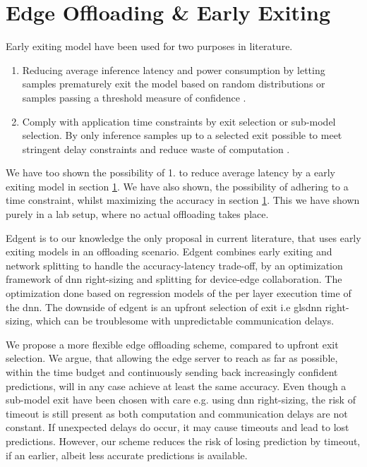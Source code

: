 \chapter{Edge Offloading \& Early Exiting}

Early exiting model have been used for two purposes in literature.

\begin{enumerate}
	\item Reducing average inference latency and power consumption by letting samples prematurely exit the model based on random distributions \cite{bibid} or samples passing a threshold measure of confidence \cite{teerapittayanon_branchynet:_2016}.
	\item Comply with application time constraints by exit selection or sub-model selection. By only inference samples up to a selected exit possible to meet stringent delay constraints and reduce waste of computation \cite{li_edge_2018}. 
\end{enumerate}

We have too shown the possibility of 1. to reduce average latency by a early exiting model in section \ref{}. We have also shown, the possibility of adhering to a time constraint, whilst maximizing the accuracy in section \ref{}. This we have shown purely in a lab setup, where no actual offloading takes place. 

Edgent \cite{li_edge_2018} is to our knowledge the only proposal in current literature, that uses early exiting models in an offloading scenario. Edgent combines early exiting and network splitting to handle the accuracy-latency trade-off, by an optimization framework of \gls{dnn} right-sizing and splitting for device-edge collaboration. The optimization done based on regression models of the per layer execution time of the \gls{dnn}. The downside of edgent is an upfront selection of exit i.e gls{dnn} right-sizing, which can be troublesome with unpredictable communication delays. 

We propose a more flexible edge offloading scheme, compared to upfront exit selection. We argue, that allowing the edge server to reach as far as possible, within the time budget and continuously sending back increasingly confident predictions, will in any case achieve at least the same accuracy. Even though a sub-model exit have been chosen with care e.g. using \gls{dnn} right-sizing, the risk of timeout is still present as both computation and communication delays are not constant. If unexpected delays do occur, it may cause timeouts and lead to lost predictions. However, our scheme reduces the risk of losing prediction by timeout, if an earlier, albeit less accurate predictions is available. 

